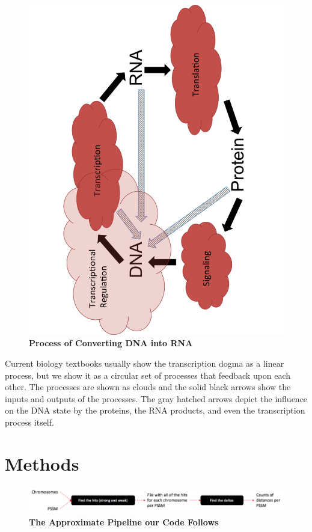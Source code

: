 \documentclass{article}
\newcommand{\tab}{\hspace{9mm}}
\begin{document}
\begin{figure}[H]
  \centering
  \includegraphics[scale=0.25,angle=270]{transcription_process.pdf}
  \caption{\textbf{Process of Converting DNA into RNA}}
  \label{fig:transcriptionprocess}
\end{figure}

\tab Current biology textbooks usually show the transcription dogma as a linear process, but we show it as a circular set of processes that feedback upon each other. The processes are shown as clouds and the solid black arrows show the inputs and outputs of the processes. The gray hatched arrows depict the influence on the DNA state by the proteins, the RNA products, and even the transcription process itself.

\section{Methods}

\begin{figure}[H]
  \centering
  \includegraphics[scale=0.3]{pipeline.png}
  \caption{\textbf{The Approximate Pipeline our Code Follows}}
  \label{fig:pipeline}
\end{figure}
\end{document}
